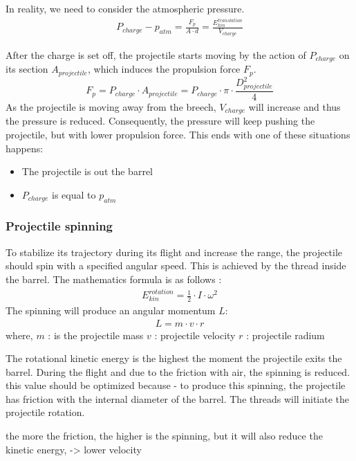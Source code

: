 \documentclass[12pt,a4paper]{article}
\begin{document}
In reality, we need to consider the atmospheric pressure. 
\begin{eqnarray}
	P_{charge} - p_{atm} = \frac{F_p}{A \cdot d} = \frac{E_{kin}^{translation}}{V_{charge}}
\end{eqnarray}


After the charge is set off, the projectile starts moving by the action of $P_{charge}$ on its section $A_{projectile}$, which induces the propulsion force $F_p$. 
\begin{equation}
	F_p = P_{charge} \cdot A_{projectile} =  P_{charge} \cdot \pi \cdot \frac{D_{projectile}^2}{4}
\end{equation}
As the projectile is moving away from the breech, $ V_{charge}$ will increase and thus the pressure is reduced. Consequently, the pressure will keep pushing the projectile, but with lower propulsion force. This ends with one of these situations happens:  
\begin{itemize}
	\item The projectile is out the barrel
	\item $P_{charge}$ is equal to $p_{atm}$
\end{itemize}

\subsubsection{Projectile spinning}
To stabilize its trajectory during its flight and increase the range, the projectile should spin with a specified angular speed. This is achieved by the thread inside the barrel. The mathematics formula is as follows :  
\begin{eqnarray}
	E_{kin}^{rotation} = \frac{1}{2} \cdot I \cdot \omega ^ 2
\end{eqnarray}
The spinning will produce an angular momentum $L$:
\begin{eqnarray}
	L = m \cdot v \cdot r
\end{eqnarray}
where, 
$m$ : is the projectile mass
$v$ : projectile velocity
$r$ : projectile radium

The rotational kinetic energy is the highest the moment the projectile exits the barrel. During the flight and due to the friction with air, the spinning is reduced.
this value should be optimized because
- to produce this spinning, the projectile has friction with the internal diameter of the barrel. The threads will initiate the projectile rotation. 

the more the friction, the higher is the spinning, but it will also reduce the kinetic energy, -> lower velocity
\end{document}
